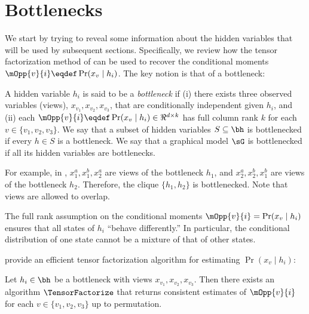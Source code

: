 \section{Bottlenecks}
\label{sec:bottlenecks}

We start by trying to reveal some information about the hidden variables
that will be used by subsequent sections.
Specifically, we review how
the tensor factorization method of \citet{anandkumar13tensor}
can be used to recover the conditional moments
$\mOpp{v}{i} \eqdef \Pr(x_v \mid h_i)$.
The key notion is that of a bottleneck:

\begin{definition}[Bottleneck]
  \label{def:bottleneck}
  A hidden variable $h_i$ is said to be a \emph{bottleneck} if (i) there
  exists three observed variables (views), $x_{v_1}, x_{v_2}, x_{v_3}$,
  that are conditionally independent given $h_i$,
  and (ii) each $\mOpp{v}{i} \eqdef \Pr(x_v \mid h_i) \in \Re^{d \times k}$ has full column rank $k$
  for each $v \in \{v_1, v_2, v_3\}$.
  We say that a subset of hidden variables $S \subseteq \bh$ is bottlenecked
  if every $h \in S$ is a bottleneck.
  We say that a graphical model $\sG$ is bottlenecked if all its hidden variables
  are bottlenecks.
\end{definition}
For example, in , $x_1^a,x_1^b,x_2^a$ are views of the bottleneck $h_1$,
and $x_2^a,x_2^b,x_1^b$ are views of the bottleneck $h_2$.  Therefore, the clique
$\{h_1,h_2\}$ is bottlenecked.  Note that views are allowed to overlap.

The full rank assumption on the conditional moments $\mOpp{v}{i} = \Pr(x_v \mid h_i)$
ensures that all states of $h_i$ ``behave differently.''
In particular, the conditional distribution of one state cannot be
a mixture of that of other states.

%  

\citet{anandkumar12moments} provide an efficient tensor factorization algorithm
for estimating $\Pr(x_v \mid h_i)$:
\begin{theorem}
Let $h_i \in \bh$ be a bottleneck with views $x_{v_1},x_{v_2},x_{v_3}$.
Then there exists an algorithm $\TensorFactorize$ that
returns consistent estimates of $\mOpp{v}{i}$ for each $v \in \{v_1,v_2,v_3\}$ up to permutation.
\end{theorem}

